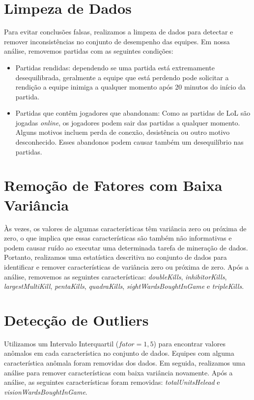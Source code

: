 \section{Limpeza de Dados}
Para evitar conclusões falsas, realizamos a limpeza de dados para detectar e remover inconsistências no conjunto de desempenho das equipes. Em nossa análise, removemos partidas com as seguintes condições:

\begin{itemize}
\item Partidas rendidas: dependendo se uma partida está extremamente desequilibrada, geralmente a equipe que está perdendo pode solicitar a rendição a equipe inimiga a qualquer momento após 20 minutos do início da partida.
\item Partidas que contêm jogadores que abandonam: Como as partidas de LoL são jogadas \textit{online}, os jogadores podem sair das partidas a qualquer momento. Alguns motivos incluem perda de conexão, desistência ou outro motivo desconhecido. Esses abandonos podem causar também um desequilíbrio nas partidas.
\end{itemize}

\section{Remoção de Fatores com Baixa Variância}
Às vezes, os valores de algumas características têm variância zero ou próxima de zero, o que implica que essas características são também não informativas e podem causar ruído ao executar uma determinada tarefa de mineração de dados. Portanto, realizamos uma estatística descritiva no conjunto de dados para identificar e remover características de variância zero ou próxima de zero. Após a análise, removemos as seguintes características: \textit{doubleKills}, \textit{inhibitorKills}, \textit {largestMultiKill}, \textit{pentaKills}, \textit {quadraKills}, \textit {sightWardsBoughtInGame} e \textit{tripleKills}.

\section{Detecção de Outliers}
Utilizamos um Intervalo Interquartil ($fator = 1,5 $) para encontrar valores anômalos em cada característica no conjunto de dados. Equipes com alguma característica anômala foram removidas dos dados. Em seguida, realizamos uma análise para remover características com baixa variância novamente. Após a análise, as seguintes características foram removidas: \textit{totalUnitsHelead} e \textit{visionWardsBoughtInGame}.

